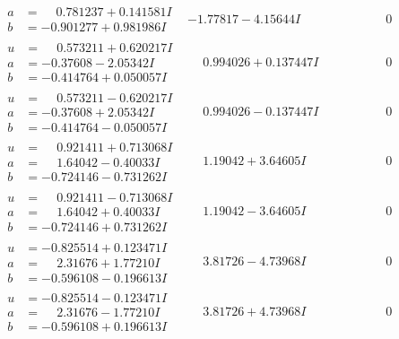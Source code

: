 \documentclass[1p]{elsarticle_modified}
\theoremstyle{definition}
\begin{document}
$$\begin{array}{c|c|c}
\begin{aligned}
a &= \phantom{-}0.781237 + 0.141581 I \\
b &= -0.901277 + 0.981986 I\end{aligned}
 & -1.77817 - 4.15644 I & \phantom{-0.000000 } 0 \\ \hline\begin{aligned}
u &= \phantom{-}0.573211 + 0.620217 I \\
a &= -0.37608 - 2.05342 I \\
b &= -0.414764 + 0.050057 I\end{aligned}
 & \phantom{-}0.994026 + 0.137447 I & \phantom{-0.000000 } 0 \\ \hline\begin{aligned}
u &= \phantom{-}0.573211 - 0.620217 I \\
a &= -0.37608 + 2.05342 I \\
b &= -0.414764 - 0.050057 I\end{aligned}
 & \phantom{-}0.994026 - 0.137447 I & \phantom{-0.000000 } 0 \\ \hline\begin{aligned}
u &= \phantom{-}0.921411 + 0.713068 I \\
a &= \phantom{-}1.64042 - 0.40033 I \\
b &= -0.724146 - 0.731262 I\end{aligned}
 & \phantom{-}1.19042 + 3.64605 I & \phantom{-0.000000 } 0 \\ \hline\begin{aligned}
u &= \phantom{-}0.921411 - 0.713068 I \\
a &= \phantom{-}1.64042 + 0.40033 I \\
b &= -0.724146 + 0.731262 I\end{aligned}
 & \phantom{-}1.19042 - 3.64605 I & \phantom{-0.000000 } 0 \\ \hline\begin{aligned}
u &= -0.825514 + 0.123471 I \\
a &= \phantom{-}2.31676 + 1.77210 I \\
b &= -0.596108 - 0.196613 I\end{aligned}
 & \phantom{-}3.81726 - 4.73968 I & \phantom{-0.000000 } 0 \\ \hline\begin{aligned}
u &= -0.825514 - 0.123471 I \\
a &= \phantom{-}2.31676 - 1.77210 I \\
b &= -0.596108 + 0.196613 I\end{aligned}
 & \phantom{-}3.81726 + 4.73968 I & \phantom{-0.000000 } 0\\

\end{array}$$
\end{document}
